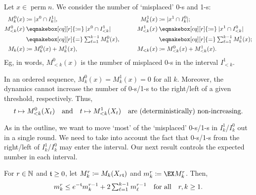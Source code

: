 \documentclass{article}
\DeclareMathOperator{\perm}{perm}
\begin{document}
\begin{defn}
\label{def:harm:2:cuts}
Let $x \in \perm n$.
We consider the number of `misplaced' 0-s and 1-s:
\begin{alignat*}{2}
	M_k^0(x)
&\cq
	\abs{ x^0 \cap I_k^1 },
&\qquad
	M_k^1(x)
&\cq
	\abs{ x^1 \cap I_k^0 };
\\
	M_{< k}^0(x)
&\mathbin{\eqmakebox[cq][r]{\ensuremath\cq}}
	\abs{ x^0 \cap I_{< k}^1 }
&\qquad
	M_{< k}^1(x)
&\mathbin{\eqmakebox[cq][r]{\ensuremath\cq}}
	\abs{ x^1 \cap I_{< k}^0 }
\\
&\mathbin{\eqmakebox[cq][r]{\ensuremath=}}
	\sumt{\ell=1}[k-1]
	M_k^0(x),
&\qquad
&\mathbin{\eqmakebox[cq][r]{\ensuremath=}}
	\sumt{\ell=1}[k-1]
	M_k^1(x);
\\
	M_k(x)
&\cq
	M_k^0(x) + M_k^1(x),
&\qquad
	M_{< k}(x)
&\cq
	M_{< k}^0(x) + M_{< k}^1(x).
\end{alignat*}
Eg, in words, $M_{< k}^0(x)$ is the number of misplaced 0-s in the interval $I_{< k}^1$.
\end{defn}

In an ordered sequence, $M_k^0(x) = M_k^1(x) = 0$ for all $k$.
Moreover, the dynamics cannot increase the number of 0-s/1-s to the right/left of a given threshold, respectively.
Thus,
\[
	t
\mapsto
	M_{< k}^0(X_t)
\Qand
	t
\mapsto
	M_{< k}^1(X_t)
\quad
	\text{are (deterministically) non-increasing}.
\]

As in the outline, we want to move `most' of the `misplaced' 0-s/1-s in $I_k^1$/$I_k^0$ out in a single round.
We need to take into account the fact that 0-s/1-s from the right/left of $I_k^1$/$I_k^0$ may enter the interval.
Our next result controls the expected number in each interval.

\begin{prop}
\label{res:harm:2:rr:derivation}
For $r \in \mathbb{N}$ and $\mathfrak{t} \ge 0$, let $M_k^r \coloneqq M_k(X_{r\mathfrak{t}})$ and $m_k^r \cq \ex{M_k^r}$.
Then,
\[
	m_k^r
\le
	e^{-\mft}
	m_k^{r-1}
+	2
	\sumt{\ell=1}[k-1]
	m_\ell^{r-1}
\Qforall
	r,k \ge 1.
\]
\end{prop}
\end{document}
